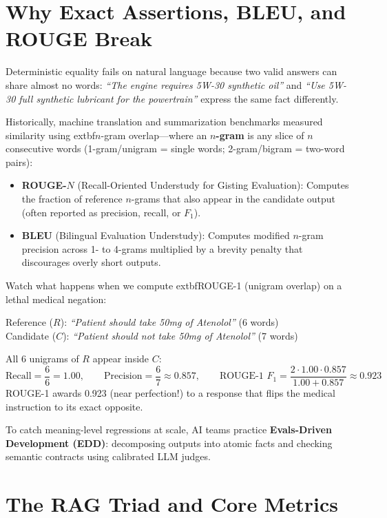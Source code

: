 \section{Why Exact Assertions, BLEU, and ROUGE Break}

Deterministic equality fails on natural language because two valid answers can share almost no words: \emph{``The engine requires 5W-30 synthetic oil''} and \emph{``Use 5W-30 full synthetic lubricant for the powertrain''} express the same fact differently.

Historically, machine translation and summarization benchmarks measured similarity using 	extbf{$n$-gram overlap}—where an \textbf{$n$-gram} is any slice of $n$ consecutive words (1-gram/unigram = single words; 2-gram/bigram = two-word pairs):
\begin{itemize}[leftmargin=18pt]
  \item \textbf{ROUGE-$N$} (Recall-Oriented Understudy for Gisting Evaluation): Computes the fraction of reference $n$-grams that also appear in the candidate output (often reported as precision, recall, or $F_1$).
  \item \textbf{BLEU} (Bilingual Evaluation Understudy): Computes modified $n$-gram precision across 1- to 4-grams multiplied by a brevity penalty that discourages overly short outputs.
\end{itemize}

Watch what happens when we compute 	extbf{ROUGE-1} (unigram overlap) on a lethal medical negation:
\begin{center}
Reference ($R$): \emph{``Patient should take 50mg of Atenolol''} (6 words)\\
Candidate ($C$): \emph{``Patient should not take 50mg of Atenolol''} (7 words)
\end{center}
All 6 unigrams of $R$ appear inside $C$:
\[
\text{Recall} = \frac{6}{6} = 1.00, \qquad \text{Precision} = \frac{6}{7} \approx 0.857, \qquad \text{ROUGE-1 } F_1 = \frac{2 \cdot 1.00 \cdot 0.857}{1.00 + 0.857} \approx \mathbf{0.923}
\]
ROUGE-1 awards 0.923 (near perfection!) to a response that flips the medical instruction to its exact opposite.

To catch meaning-level regressions at scale, AI teams practice \textbf{Evals-Driven Development (EDD)}: decomposing outputs into atomic facts and checking semantic contracts using calibrated LLM judges.

\section{The RAG Triad and Core Metrics}

